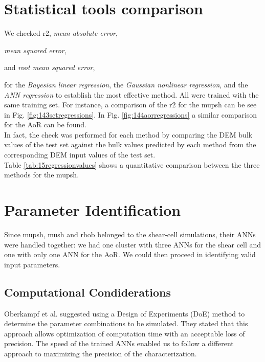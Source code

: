 \section{Statistical tools comparison}
\label{sec:statisticaltoolscomparison}

%



We checked \acs{r2}, \textit{mean absolute error}, 

\textit{mean squared error},

and \textit{root mean squared error},

for the \textit{Bayesian linear
regression}, the \textit{Gaussian nonlinear
regression}, and the
\textit{\acs{ANN} regression} to establish the most effective method.
All were trained with the same training set. 
For instance, a comparison of the \acs{r2} for the \acs{mupsh} can be see in 
Fig. \ref{fig:143sctregressions}.
In Fig. \ref{fig:144aorregressions} a similar comparison for the \acs{AoR} can
be found.\\
In fact, the check was performed for each method by comparing the
\acs{DEM} bulk values of the test set against the bulk values predicted by each method from the 
corresponding \acs{DEM} input values of the test set. \\
Table \ref{tab:15regressionvalues} shows a quantitative comparison between the
three methods for the \acs{mupsh}. 


\section{Parameter Identification}
\label{sec:parameteridentification}

Since \acs{mupsh}, \acs{mush} and \acs{rhob} belonged to the shear-cell
simulations, their \acs{ANNs} were handled together: we had one cluster with three 
\acs{ANNs} for the shear cell and one with only one \acs{ANN} for the \acs{AoR}.
We could then proceed in identifying valid input parameters.

\subsection{Computational Condiderations}
\label{subsec:computationalcondiderations}

Oberkampf et al. \cite{RefWorks:160} suggested using a Design of Experiments
(\acs{DoE}) method to determine the parameter combinations to be simulated.
They stated that this approach allows optimization of computation time
with an acceptable loss of precision.
The speed of the trained \acs{ANNs} enabled us to follow a different approach to
maximizing the precision of the characterization.\\

